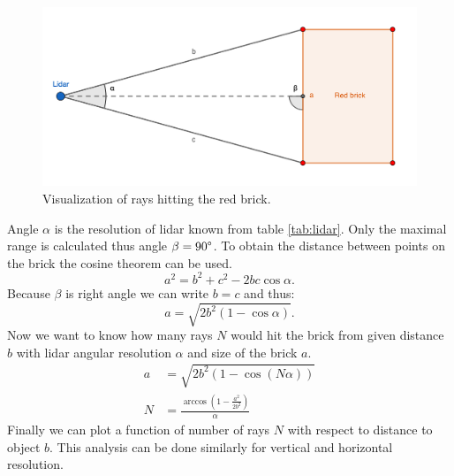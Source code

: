 \begin{figure}[H]
	\centering
	\includegraphics[scale=1.1]{fig/lidar_range.png}
	\caption[Lidar range study]{Visualization of rays hitting the red brick.}
	\label{fig:range}
\end{figure}

Angle $\alpha$ is the resolution of lidar known from table \ref{tab:lidar}. Only the maximal range is calculated thus angle $\beta = 90\degree$. To obtain the distance between points on the brick the cosine theorem can be used.
\begin{equation}
a^2 = b^2 + c^2 - 2bc \cos \alpha.
\end{equation}
Because $\beta$ is right angle we can write $b = c$ and thus:
\begin{equation}
a = \sqrt{2b^2 \left(1-\cos \alpha \right)}.
\end{equation}
Now we want to know how many rays $N$ would hit the brick from given distance $b$ with lidar angular resolution $\alpha$ and size of the brick $a$. 
\begin{align}
a &= \sqrt{2b^2 \left(1-\cos \left( N \alpha \right) \right)} \\
N &= \frac{\arccos\left(1-\frac{a^2}{2b^2}\right) }{\alpha}
\label{eq:rays}
\end{align}
Finally we can plot a function of number of rays $N$ with respect to distance to object $b$. This analysis can be done similarly for vertical and horizontal resolution.

